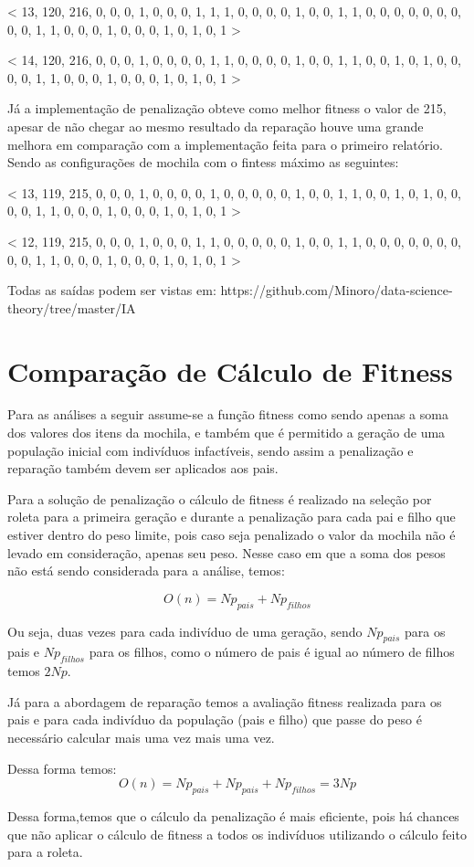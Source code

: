\documentclass[11pt]{article}
\begin{document}
< 13, 120, 216, 0, 0, 0, 1, 0, 0, 0, 1, 1, 1, 0, 0, 0, 0, 1, 0, 0, 1, 1, 0, 0, 0, 0, 0, 0, 0, 0, 0, 1, 1, 0, 0, 0, 1, 0, 0, 0, 1, 0, 1, 0, 1 > 

< 14, 120, 216, 0, 0, 0, 1, 0, 0, 0, 0, 1, 1, 0, 0, 0, 0, 1, 0, 0, 1, 1, 0, 0, 1, 0, 1, 0, 0, 0, 0, 1, 1, 0, 0, 0, 1, 0, 0, 0, 1, 0, 1, 0, 1 > 


Já a implementação de penalização obteve como melhor fitness o valor de 215, apesar de não chegar ao mesmo resultado da reparação houve uma grande melhora em comparação com a implementação feita para o primeiro relatório. Sendo as configurações de mochila com o fintess máximo as seguintes: 

< 13, 119, 215, 0, 0, 0, 1, 0, 0, 0, 0, 1, 0, 0, 0, 0, 0, 1, 0, 0, 1, 1, 0, 0, 1, 0, 1, 0, 0, 0, 0, 1, 1, 0, 0, 0, 1, 0, 0, 0, 1, 0, 1, 0, 1 > 

< 12, 119, 215, 0, 0, 0, 1, 0, 0, 0, 1, 1, 0, 0, 0, 0, 0, 1, 0, 0, 1, 1, 0, 0, 0, 0, 0, 0, 0, 0, 0, 1, 1, 0, 0, 0, 1, 0, 0, 0, 1, 0, 1, 0, 1 > 

Todas as saídas podem ser vistas em: https://github.com/Minoro/data-science-theory/tree/master/IA


\section{Comparação de Cálculo de Fitness}

Para as análises a seguir assume-se a função fitness como sendo apenas a soma dos valores dos itens da mochila, e também que é permitido a geração de uma população inicial com indivíduos infactíveis, sendo assim a penalização e reparação também devem ser aplicados aos pais.

Para a solução de penalização o cálculo de fitness é realizado na seleção por roleta para a primeira geração e durante a penalização para cada pai e filho que estiver dentro do peso limite, pois caso seja penalizado o valor da mochila não é levado em consideração, apenas seu peso. Nesse caso em que a soma dos pesos não está sendo considerada para a análise, temos:

\begin{equation} \label{eq:complexidade_pelanizacao}
	O(n) = Np_{pais} + Np_{filhos}
\end{equation}

Ou seja, duas vezes para cada indivíduo de uma geração, sendo $Np_{pais}$ para os pais e $Np_{filhos}$ para os filhos, como o número de pais é igual ao número de filhos temos $2Np$.

Já para a abordagem de reparação temos a avaliação fitness realizada para os pais e para cada indivíduo da população (pais e filho) que passe do peso é necessário calcular mais uma vez mais uma vez.

Dessa forma temos:
\begin{equation} \label{eq:complexidade_reparacao}
	O(n) = Np_{pais} + Np_{pais} + Np_{filhos} = 3Np
\end{equation}

Dessa forma,temos que o cálculo da penalização é mais eficiente, pois há chances que não aplicar o cálculo de fitness a todos os indivíduos utilizando o cálculo feito para a roleta.
\end{document}
